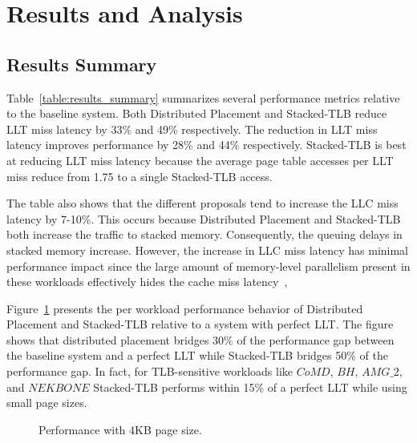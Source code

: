 
% 

\section{Results and Analysis} 
\label{sec:result}

\subsection{Results Summary}

\noindent Table~\ref{table:results_summary} summarizes several
performance metrics relative to the baseline system. Both Distributed
Placement and Stacked-TLB reduce LLT miss latency by 33\% and 49\%
respectively. The reduction in LLT miss latency improves performance
by 28\% and 44\% respectively. Stacked-TLB is best at reducing LLT
miss latency because the average page table accesses per LLT miss
reduce from 1.75 to a single Stacked-TLB access.

The table also shows that the different proposals tend to increase the
LLC miss latency by 7-10\%. This occurs because Distributed Placement
and Stacked-TLB both increase the traffic to stacked memory.
Consequently, the queuing delays in stacked memory increase. However,
the increase in LLC miss latency has minimal performance impact since
the large amount of memory-level parallelism present in these
workloads effectively hides the cache miss latency~\cite{bwa},

Figure~\ref{fig:summary_4k_pages} presents the per workload
performance behavior of Distributed Placement and Stacked-TLB relative
to a system with perfect LLT. The figure shows that distributed
placement bridges 30\% of the performance gap between the baseline
system and a perfect LLT while Stacked-TLB bridges 50\% of the
performance gap. In fact, for TLB-sensitive workloads like $CoMD$,
$BH$, $AMG\_2$, and $NEKBONE$ Stacked-TLB performs within 15\% of a
perfect LLT while using small page sizes.

\begin{figure}[tp] 
\vspace{-0 in} \centering
\centerline{}

\caption{\small Performance with 4KB page size.\normalsize}
\label{fig:summary_4k_pages} 
\vspace{-0. in}
\end{figure}

